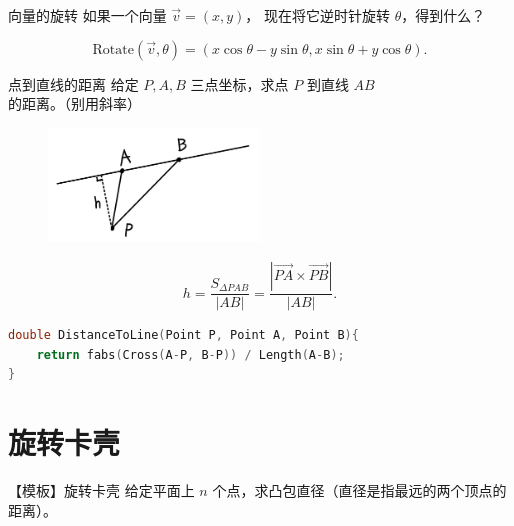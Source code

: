 \documentclass{beamer}
\begin{document}
\begin{frame}[fragile]{向量的旋转}
    如果一个向量 $\overrightarrow{v}=(x,y)$，
    现在将它逆时针旋转 $\theta$，得到什么？

    \vspace{1em}\pause
    \begin{equation}
        \text{Rotate}(\overrightarrow{v},\theta)=(x\cos\theta-y\sin\theta,x\sin\theta+y\cos\theta).
    \end{equation}

\end{frame}

\begin{frame}[fragile]{点到直线的距离}
    \footnotesize
    给定 $P,A,B$ 三点坐标，求点 $P$ 到直线 $AB$ 的距离。（别用斜率）

    \vspace{1em}\pause
    \begin{figure}[H]
        \centering
        \includegraphics[width=0.5\textwidth]{pic/ptl.jpg}
    \end{figure}
    \begin{equation}
        h=\frac{S_{\Delta PAB}}{|AB|}=\frac{|\overrightarrow{PA}\times \overrightarrow{PB}|}{|AB|}.
    \end{equation}

    \vspace{1em}\pause
    \begin{lstlisting}[language=c++]
double DistanceToLine(Point P, Point A, Point B){
    return fabs(Cross(A-P, B-P)) / Length(A-B);
}
    \end{lstlisting}
\end{frame}

\section{旋转卡壳}

\begin{frame}{【模板】旋转卡壳}
    \small
    给定平面上 $n$ 个点，求凸包直径（直径是指最远的两个顶点的距离）。
\end{frame}
\end{document}
